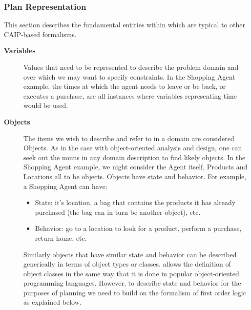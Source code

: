 \subsubsection{\eu Plan Representation}
\label{sec:europa:pr}

This section describes the fundamental entities within \eu which are
typical to other CAIP-based formalisms.

\begin{description}

\item[\textbf{Variables}] Values that need to be represented to
  describe the problem domain and over which we may want to specify
  constraints. In the Shopping Agent example, the times at which the
  agent needs to leave or be back, or executes a purchase, are all
  instances where variables representing time would be used.

\item[\textbf{Objects}] The items we wish to describe and refer to in
  a domain are considered Objects. As in the case with object-oriented
  analysis and design, one can seek out the nouns in any domain
  description to find likely objects. In the Shopping Agent example,
  we night consider the Agent itself, Products and Locations all to be
  objects. Objects have state and behavior. For example, a Shopping
  Agent can have:

  \begin{itemize}

  \item State: it's location, a bag that contains the products it has
    already purchased (the bag can in turn be another object), etc.

  \item Behavior: go to a location to look for a product, perform a
    purchase, return home, etc.

  \end{itemize}

  Similarly objects that have similar state and behavior can be
  described generically in terms of object types or classes. \eu
  allows the definition of object classes in the same way that it is
  done in popular object-oriented programming languages. However, to
  describe state and behavior for the purposes of planning we need to
  build on the formalism of first order logic as explained below.


\end{description}
